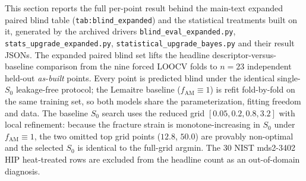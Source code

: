 \documentclass[12pt,a4paper,twocolumn]{article}
\begin{document}
This section reports the full per-point result behind the main-text expanded paired blind table
(\texttt{tab:blind\_expanded}) and the statistical treatments built on it, generated by the archived drivers
\texttt{blind\_eval\_expanded.py}, \texttt{stats\_upgrade\_expanded.py}, \texttt{statistical\_upgrade\_bayes.py} and their result JSONs. The expanded
paired blind set lifts the headline descriptor-versus-baseline comparison from the nine forced LOOCV folds
to $n = 23$ independent held-out \emph{as-built} points. Every point is predicted blind under the identical
single-$S_0$ leakage-free protocol; the Lemaitre baseline ($f_{\mathrm{AM}} \equiv 1$) is refit fold-by-fold on
the same training set, so both models share the parameterization, fitting freedom and data. The baseline $S_0$
search uses the reduced grid $[0.05, 0.2, 0.8, 3.2]$ with local refinement: because the fracture strain is
monotone-increasing in $S_0$ under $f_{\mathrm{AM}} \equiv 1$, the two omitted top grid points ($12.8$, $50.0$)
are provably non-optimal and the selected $S_0$ is identical to the full-grid argmin. The 30 NIST mds2-3402
HIP heat-treated rows are excluded from the headline count as an out-of-domain diagnosis.
\end{document}
